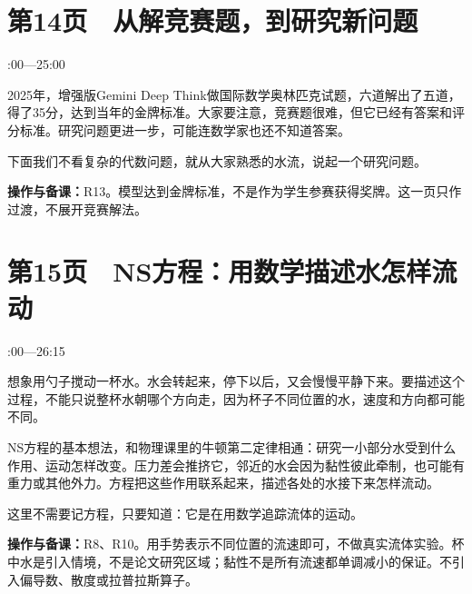\documentclass[UTF8,a4paper,11pt,fontset=fandol]{ctexart}
\newcommand{\tip}[1]{\par{\small\color{black!65}\noindent\textbf{操作与备课：}#1\par}}
\begin{document}
\par\noindent\begin{minipage}{\linewidth}

\section*{第14页　从解竞赛题，到研究新问题}

{\small{}:00—25:00\par}

2025年，增强版Gemini Deep Think做国际数学奥林匹克试题，六道解出了五道，得了35分，达到当年的金牌标准。大家要注意，竞赛题很难，但它已经有答案和评分标准。研究问题更进一步，可能连数学家也还不知道答案。

下面我们不看复杂的代数问题，就从大家熟悉的水流，说起一个研究问题。

\tip{R13。模型达到金牌标准，不是作为学生参赛获得奖牌。这一页只作过渡，不展开竞赛解法。}

\end{minipage}\par\vspace{2mm}

\par\noindent\begin{minipage}{\linewidth}

\section*{第15页　NS方程：用数学描述水怎样流动}

{\small{}:00—26:15\par}

想象用勺子搅动一杯水。水会转起来，停下以后，又会慢慢平静下来。要描述这个过程，不能只说整杯水朝哪个方向走，因为杯子不同位置的水，速度和方向都可能不同。

NS方程的基本想法，和物理课里的牛顿第二定律相通：研究一小部分水受到什么作用、运动怎样改变。压力差会推挤它，邻近的水会因为黏性彼此牵制，也可能有重力或其他外力。方程把这些作用联系起来，描述各处的水接下来怎样流动。

这里不需要记方程，只要知道：它是在用数学追踪流体的运动。

\tip{R8、R10。用手势表示不同位置的流速即可，不做真实流体实验。杯中水是引入情境，不是论文研究区域；黏性不是所有流速都单调减小的保证。不引入偏导数、散度或拉普拉斯算子。}

\end{minipage}\par\vspace{2mm}
\end{document}
